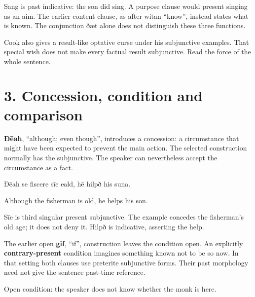 Sang is past indicative: the son did sing. A purpose clause would present singing as an aim. The earlier content clause, as after witan “know”, instead states what is known. The conjunction ðæt alone does not distinguish these three functions.

Cook also gives a result-like optative curse under his subjunctive examples. That special wish does not make every factual result subjunctive. Read the force of the whole sentence.

\section*{3. Concession, condition and comparison}

\textbf{Ðēah}, “although; even though”, introduces a concession: a circumstance that might have been expected to prevent the main action. The selected construction normally has the subjunctive. The speaker can nevertheless accept the circumstance as a fact.

Ðēah se fiscere sīe eald, hē hilpð his suna.

Although the fisherman is old, he helps his son.

Sīe is third singular present subjunctive. The example concedes the fisherman’s old age; it does not deny it. Hilpð is indicative, asserting the help.

The earlier open \textbf{gif}, “if”, construction leaves the condition open. An explicitly \textbf{contrary-present} condition imagines something known not to be so now. In that setting both clauses use preterite subjunctive forms. Their past morphology need not give the sentence past-time reference.

Open condition: the speaker does not know whether the monk is here.

